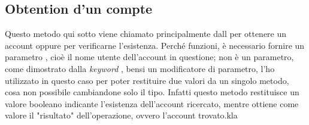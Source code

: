 \documentclass[12pt]{report}
\begin{document}
\subsection{Obtention d'un compte}

Questo metodo qui sotto viene chiamato principalmente dall  per ottenere un account oppure per verificarne l'esistenza. Perché funzioni, è necessario fornire un parametro , cioè il nome utente dell'account in questione;  non è un parametro, come dimostrato dalla \textit{keyword} , bensi un modificatore di parametro, l'ho utilizzato in questo caso per poter restituire due valori da un singolo metodo, cosa non possibile cambiandone solo il tipo. Infatti questo metodo restituisce un valore booleano indicante l'esistenza dell'account ricercato, mentre  ottiene come valore il "risultato" dell'operazione, ovvero l'account trovato.kla
\end{document}
